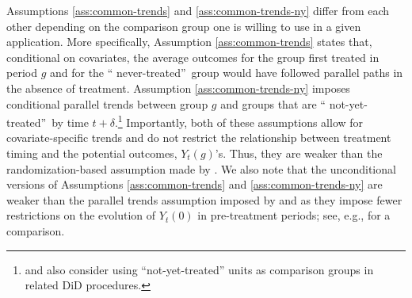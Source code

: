 \documentclass[11pt]{article}%
\theoremstyle{plain}
\numberwithin{sassumption}{section}
\numberwithin{equation}{section}
\begin{document}
Assumptions \ref{ass:common-trends} and \ref{ass:common-trends-ny} differ from
each other depending on the comparison group one is willing to use in a given
application. More specifically, Assumption \ref{ass:common-trends} states
that, conditional on covariates, the average outcomes for the group first
treated in period $g$ and for the \textquotedblleft
never-treated\textquotedblright\ group would have followed parallel paths in
the absence of treatment. Assumption \ref{ass:common-trends-ny} imposes 
conditional parallel trends between group $g$ and groups that are \textquotedblleft
not-yet-treated\textquotedblright\ by time $t+\delta$.\footnote{ \cite{Athey2006} and \cite{DeChaisemartin2017} also consider using ``not-yet-treated'' units as comparison groups in related DiD procedures.} Importantly,
both of these assumptions allow for covariate-specific trends and do not
restrict the relationship between treatment timing and the potential outcomes, 
$Y_{t}\left(  g\right)  $'s. Thus, they are weaker than the
randomization-based assumption made by \cite{Athey2018}. We also note that the
unconditional versions of Assumptions \ref{ass:common-trends} and
\ref{ass:common-trends-ny} are weaker than the parallel trends assumption
imposed by \cite{DeChaisemartin2016} and \cite{Abraham2018} as they impose
fewer restrictions on the evolution of $Y_{t}\left(  0\right)  $ in
pre-treatment periods; see, e.g., \cite{Marcus2020} for a comparison.
\end{document}
